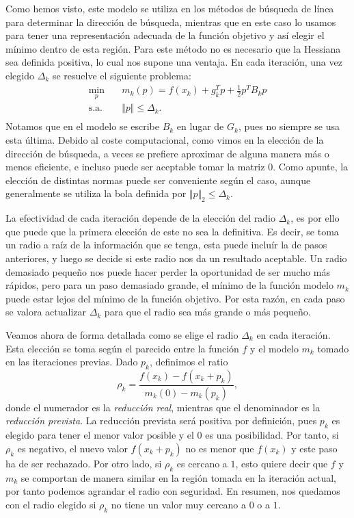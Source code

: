 \documentclass[11pt,a4paper]{book}
\theoremstyle{definition}
\theoremstyle{remark}
\begin{document}
Como hemos visto, este modelo se utiliza en los métodos de búsqueda de línea para determinar
la dirección de búsqueda, mientras que en este caso lo usamos para tener una representación
adecuada de la función objetivo y así elegir el mínimo dentro de esta región.
Para este método no es necesario que la Hessiana sea definida positiva,
lo cual nos supone una ventaja.
En cada iteración, una vez elegido $\Delta_k$ se resuelve el siguiente problema:
\begin{equation}
\label{min:tr}
\begin{aligned}
	\min_{p} \quad & m_k(p) = f(x_k) + g^T_kp + \frac{1}{2}p^TB_kp \\
	\text{s.a.} \quad & \Vert p \Vert \leq \Delta_k. \\
\end{aligned}
\end{equation}
Notamos que en el modelo se escribe $B_k$ en lugar de $G_k$, pues no siempre se usa esta última.
Debido al coste computacional, como vimos en la elección de la dirección de búsqueda, a veces se
prefiere aproximar de alguna manera más o menos eficiente, e incluso puede ser aceptable tomar la
matriz $0$. Como apunte, la elección de distintas normas puede ser conveniente según el caso,
aunque generalmente se utiliza la bola definida por
$\Vert p \Vert_2 \leq \Delta_k$.

La efectividad de cada iteración depende de la elección del radio $\Delta_k$, es por ello que
puede que la primera elección de este no sea la definitiva. Es decir, se toma un radio a raíz
de la información que se tenga, esta puede incluír la de pasos anteriores, y luego se decide si
este radio nos da un resultado aceptable. Un radio demasiado pequeño nos puede hacer perder la
oportunidad de ser mucho más rápidos, pero para un paso demasiado grande, el mínimo de la función
modelo $m_k$ puede estar lejos del mínimo de la función objetivo. Por esta razón, en cada paso
se valora actualizar $\Delta_k$ para que el radio sea más grande o más pequeño.

Veamos ahora de forma detallada como se elige el radio $\Delta_k$ en cada iteración. Esta elección
se toma según el parecido entre la función $f$ y el modelo $m_k$ tomado en las iteraciones previas.
Dado $p_k$, definimos el ratio
\begin{equation}
\label{eq:rho_k}
	\rho_k = \frac{f(x_k)-f(x_k+p_k)}{m_k(0)-m_k(p_k)},
\end{equation}
donde el numerador es la \textit{reducción real}, mientras que el denominador es la \textit{reducción prevista}.
La reducción prevista será positiva por definición, pues $p_k$ es elegido para tener el menor valor posible y el $0$ es una posibilidad.
Por tanto, si $\rho_k$ es negativo, el nuevo valor $f(x_k+p_k)$ no es menor que $f(x_k)$ y este paso ha de ser rechazado.
Por otro lado, si $\rho_k$ es cercano a $1$, esto quiere decir que $f$ y $m_k$ se comportan de manera similar en la región tomada en la iteración actual, por tanto podemos agrandar el radio con seguridad.
En resumen, nos quedamos con el radio elegido si $\rho_k$ no tiene un valor muy cercano a $0$ o a $1$.
\end{document}
